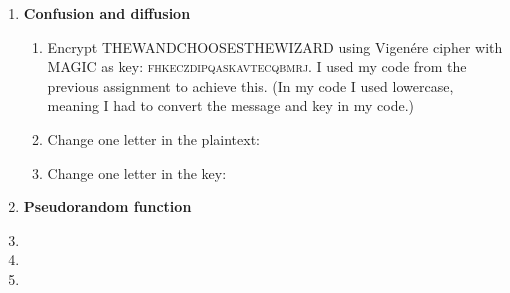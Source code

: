 \documentclass{article}
\begin{document}
	\homeworktitle
	
	\begin{enumerate}[label=\textbf{Task \arabic*:}]
		\item \textbf{Confusion and diffusion}
		\begin{enumerate}[label=\textit{Part \roman*:}]
			\item Encrypt \textsc{THEWANDCHOOSESTHEWIZARD} using Vigenére cipher with \textsc{MAGIC} as key: \textsc{fhkeczdipqaskavtecqbmrj}. I used my code from the previous assignment to achieve this. (In my code I used lowercase, meaning I had to convert the message and key in my code.)
			\item Change one letter in the plaintext: 
			\item Change one letter in the key:
		\end{enumerate}
		\item \textbf{Pseudorandom function}
		\item 
		\item 
		\item 
	\end{enumerate}
	
\end{document}

